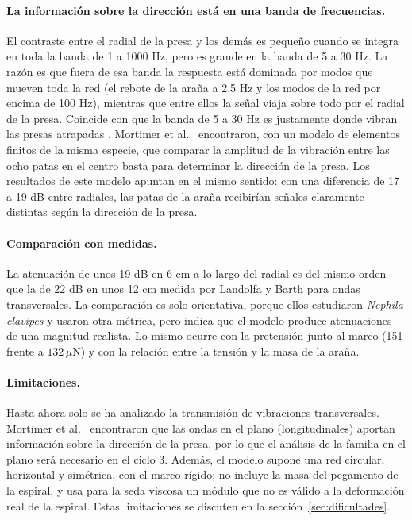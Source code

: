 \documentclass[11pt,letterpaper]{article}
\newcommand{\uN}{\,\mu\mathrm{N}}
\begin{document}
\paragraph{La información sobre la dirección está en una banda de
frecuencias.} El contraste entre el radial de la presa y los demás es pequeño
cuando se integra en toda la banda de 1 a 1000 Hz, pero es grande en la
banda de 5 a 30 Hz. La razón es que fuera de esa banda la respuesta está
dominada por modos que mueven toda la red (el rebote de la araña a 2.5 Hz y
los modos de la red por encima de 100 Hz), mientras que entre ellos la señal
viaja sobre todo por el radial de la presa. Coincide con que la banda de 5 a
30 Hz es justamente donde vibran las presas atrapadas \cite{landolfa1996}.
Mortimer et al.\ \cite{mortimer2019decoding} encontraron, con un modelo de
elementos finitos de la misma especie, que comparar la amplitud de la
vibración entre las ocho patas en el centro basta para determinar la
dirección de la presa. Los resultados de este modelo apuntan en el mismo
sentido: con una diferencia de 17 a 19 dB entre radiales, las patas de la
araña recibirían señales claramente distintas según la dirección de la
presa.

\paragraph{Comparación con medidas.} La atenuación de unos 19 dB en 6 cm a
lo largo del radial es del mismo orden que la de 22 dB en unos 12 cm medida
por Landolfa y Barth \cite{landolfa1996} para ondas transversales. La
comparación es solo orientativa, porque ellos estudiaron \textit{Nephila
clavipes} y usaron otra métrica, pero indica que el modelo produce
atenuaciones de una magnitud realista. Lo mismo ocurre con la pretensión
junto al marco (151 frente a $132\uN$) y con la relación entre la tensión y
la masa de la araña.

\paragraph{Limitaciones.} Hasta ahora solo se ha analizado la transmisión
de vibraciones transversales. Mortimer et al.\ \cite{mortimer2019decoding}
encontraron que las ondas en el plano (longitudinales) aportan información
sobre la dirección de la presa, por lo que el análisis de la familia en el
plano será necesario en el ciclo 3. Además, el modelo supone una red
circular, horizontal y simétrica, con el marco rígido; no incluye la masa
del pegamento de la espiral, y usa para la seda viscosa un módulo que no es
válido a la deformación real de la espiral. Estas limitaciones se discuten
en la sección~\ref{sec:dificultades}.
\end{document}
